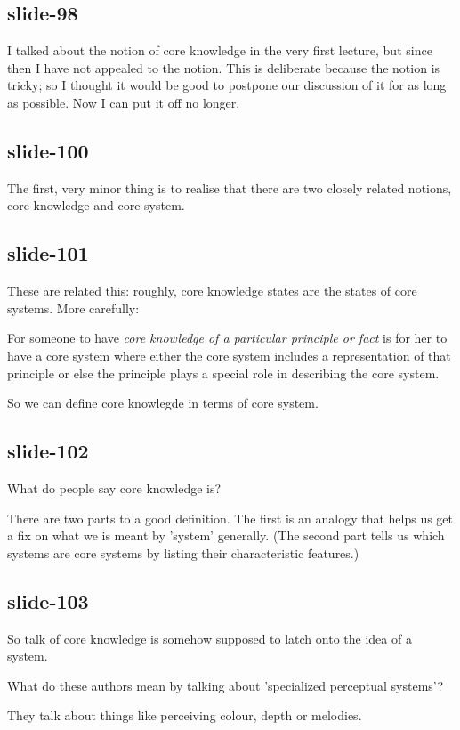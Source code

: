 \documentclass[12pt,\papersize]{extarticle}
\begin{document}
\subsection{slide-98}
I talked about the notion of core knowledge in the very first lecture, but since then I
have not appealed to the notion.
This is deliberate because the notion is tricky; so I thought it would be good to postpone
our discussion of it for as long as possible.
Now I can put it off no longer.

\subsection{slide-100}
The first, very minor thing is to realise that there are two closely related notions, core
knowledge and core system.

\subsection{slide-101}
These are related this: roughly, core knowledge states are the states of core systems.  More
carefully:

For someone to have \textit{core knowledge of a particular principle or
fact} is for her to have a core system where
either the core system includes a representation of that principle or
else the principle plays a special role in describing the core system.

So we can define core knowlegde in terms of core system.

\subsection{slide-102}
What do people say core knowledge is?

There are two parts to a good definition. The first is an analogy that
helps us get a fix on what we is meant by 'system' generally. (The second
part tells us which systems are core systems by listing their
characteristic features.)

\subsection{slide-103}
So talk of core knowledge is somehow supposed to latch onto the idea of a system.

What do these authors mean by talking about 'specialized perceptual systems'?

They talk about things like perceiving colour, depth or melodies.
\end{document}
